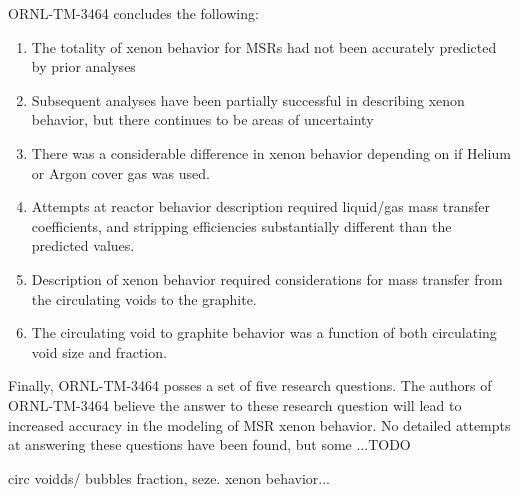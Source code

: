 ORNL-TM-3464 concludes the following\cite[96]{ORNLTM3464}:
\begin{enumerate}
    \item The totality of xenon behavior for MSRs had not been accurately predicted by prior analyses
    \item Subsequent analyses have been partially successful in describing xenon behavior, but there continues to be areas of uncertainty
    \item There was a considerable difference in xenon behavior depending on if Helium or Argon cover gas was used.
    \item Attempts at reactor behavior description required liquid/gas mass transfer coefficients, and stripping efficiencies substantially different than the predicted values.
    \item Description of xenon behavior required considerations for mass transfer from the circulating voids to the graphite. 
    \item The circulating void to graphite behavior was a function of both circulating void size and fraction.
\end{enumerate}
Finally, ORNL-TM-3464 posses a set of five research questions. The authors of ORNL-TM-3464 believe the answer to these research question will lead to increased accuracy in the modeling of MSR xenon behavior.  No detailed attempts at answering these questions have been found, but some ...TODO

circ voidds/ bubbles fraction, seze.
xenon behavior...